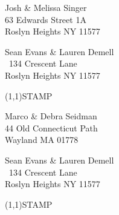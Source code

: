 \documentclass[12pt]{article}
\begin{document}
\begin{center} \begin{Huge} \vspace*{\fill}
Josh \& Melissa Singer\\
63 Edwards Street 1A\\
Roslyn Heights NY 11577\\
\vspace{\fill} \end{Huge} \end{center}

\clearpage

\begin{minipage}{.5\linewidth} \noindent
Sean Evans \& Lauren Demell\\\ 
134 Crescent Lane\\ 
Roslyn Heights NY 11577
\end{minipage}
\begin{minipage}{.5\linewidth \hspace{-.2in} \vspace{-.3in}}
\begin{flushright}
\framebox(1,1){STAMP}
\end{flushright}
\end{minipage}

\begin{center} \begin{Huge} \vspace*{\fill}
Marco \& Debra Seidman\\
44 Old Connecticut Path\\
Wayland MA 01778\\
\vspace{\fill} \end{Huge} \end{center}

\clearpage

\begin{minipage}{.5\linewidth} \noindent
Sean Evans \& Lauren Demell\\\ 
134 Crescent Lane\\ 
Roslyn Heights NY 11577
\end{minipage}
\begin{minipage}{.5\linewidth \hspace{-.2in} \vspace{-.3in}}
\begin{flushright}
\framebox(1,1){STAMP}
\end{flushright}
\end{minipage}
\end{document}
